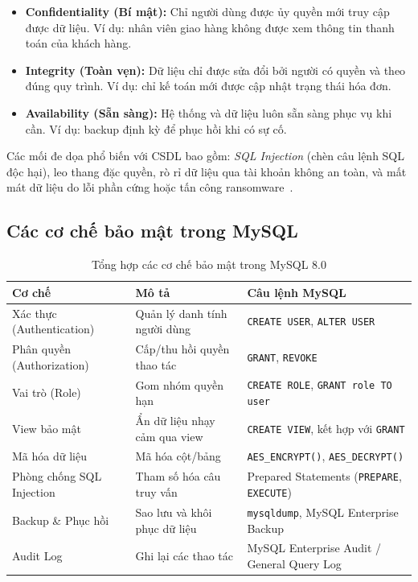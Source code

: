 \documentclass[11pt]{report}
\begin{document}
\begin{itemize}
    \item \textbf{Confidentiality (Bí mật):} Chỉ người dùng được ủy quyền mới truy cập được dữ liệu. Ví dụ: nhân viên giao hàng không được xem thông tin thanh toán của khách hàng.
    \item \textbf{Integrity (Toàn vẹn):} Dữ liệu chỉ được sửa đổi bởi người có quyền và theo đúng quy trình. Ví dụ: chỉ kế toán mới được cập nhật trạng thái hóa đơn.
    \item \textbf{Availability (Sẵn sàng):} Hệ thống và dữ liệu luôn sẵn sàng phục vụ khi cần. Ví dụ: backup định kỳ để phục hồi khi có sự cố.
\end{itemize}

Các mối đe dọa phổ biến với CSDL bao gồm: \textit{SQL Injection} (chèn câu lệnh SQL độc hại), leo thang đặc quyền, rò rỉ dữ liệu qua tài khoản không an toàn, và mất mát dữ liệu do lỗi phần cứng hoặc tấn công ransomware~\cite{mysql80_security}.

\subsection{Các cơ chế bảo mật trong MySQL}
\label{subsec:baomat_coche}

\begin{table}[H]
    \centering
    \renewcommand{\tabularxcolumn}[1]{m{#1}}
    \begin{tabularx}{\textwidth}{|l|>{\raggedright\arraybackslash}X|>{\raggedright\arraybackslash}X|} \hline
        \rowcolor{teal!30}
        \textbf{Cơ chế} & \textbf{Mô tả} & \textbf{Câu lệnh MySQL} \\ \hline
        Xác thực (Authentication)  & Quản lý danh tính người dùng & \texttt{CREATE USER}, \texttt{ALTER USER} \\ \hline
        Phân quyền (Authorization) & Cấp/thu hồi quyền thao tác   & \texttt{GRANT}, \texttt{REVOKE} \\ \hline
        Vai trò (Role)             & Gom nhóm quyền hạn           & \texttt{CREATE ROLE}, \texttt{GRANT role TO user} \\ \hline
        View bảo mật               & Ẩn dữ liệu nhạy cảm qua view & \texttt{CREATE VIEW}, kết hợp với \texttt{GRANT} \\ \hline
        Mã hóa dữ liệu             & Mã hóa cột/bảng              & \texttt{AES\_ENCRYPT()}, \texttt{AES\_DECRYPT()} \\ \hline
        Phòng chống SQL Injection  & Tham số hóa câu truy vấn     & Prepared Statements (\texttt{PREPARE}, \texttt{EXECUTE}) \\ \hline
        Backup \& Phục hồi         & Sao lưu và khôi phục dữ liệu & \texttt{mysqldump}, MySQL Enterprise Backup \\ \hline
        Audit Log                  & Ghi lại các thao tác         & MySQL Enterprise Audit / General Query Log \\ \hline
    \end{tabularx}
    \caption{Tổng hợp các cơ chế bảo mật trong MySQL 8.0}
    \label{tab:baomat_coche}
\end{table}
\end{document}
